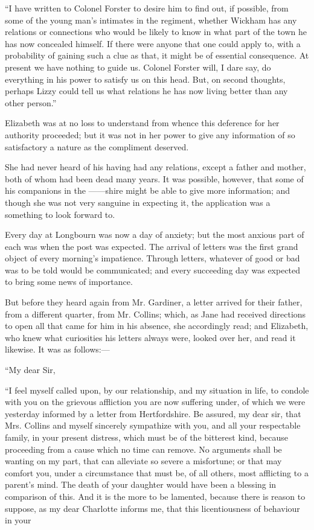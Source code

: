 \documentclass[12pt,openright]{book}
\begin{document}
“I have written to Colonel Forster to desire him to find out, if possible, from some of the young man’s intimates in the regiment, whether Wickham has any relations or connections who would be likely to know in what part of the town he has now concealed himself. If there were anyone that one could apply to, with a probability of gaining such a clue as that, it might be of essential consequence. At present we have nothing to guide us. Colonel Forster will, I dare say, do everything in his power to satisfy us on this head. But, on second thoughts, perhaps Lizzy could tell us what relations he has now living better than any other person.”

Elizabeth was at no loss to understand from whence this deference for her authority proceeded; but it was not in her power to give any information of so satisfactory a nature as the compliment deserved.

She had never heard of his having had any relations, except a father and mother, both of whom had been dead many years. It was possible, however, that some of his companions in the ——shire might be able to give more information; and though she was not very sanguine in expecting it, the application was a something to look forward to.

Every day at Longbourn was now a day of anxiety; but the most anxious part of each was when the post was expected. The arrival of letters was the first grand object of every morning’s impatience. Through letters, whatever of good or bad was to be told would be communicated; and every succeeding day was expected to bring some news of importance.

But before they heard again from Mr. Gardiner, a letter arrived for their father, from a different quarter, from Mr. Collins; which, as Jane had received directions to open all that came for him in his absence, she accordingly read; and Elizabeth, who knew what curiosities his letters always were, looked over her, and read it likewise. It was as follows:—

“My dear Sir,

“I feel myself called upon, by our relationship, and my situation in life, to condole with you on the grievous affliction you are now suffering under, of which we were yesterday informed by a letter from Hertfordshire. Be assured, my dear sir, that Mrs. Collins and myself sincerely sympathize with you, and all your respectable family, in your present distress, which must be of the bitterest kind, because proceeding from a cause which no time can remove. No arguments shall be wanting on my part, that can alleviate so severe a misfortune; or that may comfort you, under a circumstance that must be, of all others, most afflicting to a parent’s mind. The death of your daughter would have been a blessing in comparison of this. And it is the more to be lamented, because there is reason to suppose, as my dear Charlotte informs me, that this licentiousness of behaviour in your
\end{document}
